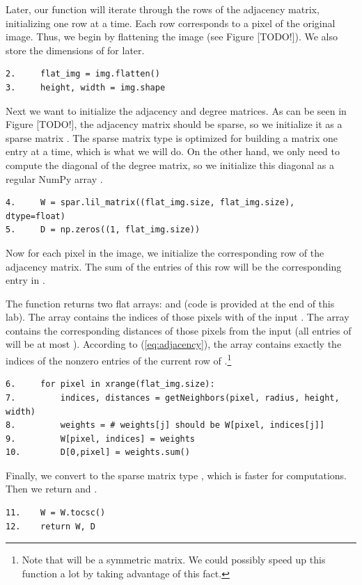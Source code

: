 Later, our function will iterate through the rows of the adjacency matrix, initializing one row at a time. Each row corresponds to a pixel of the original image. Thus, we begin by flattening the image (see Figure [TODO!]). We also store the dimensions of  for later.
\begin{lstlisting}
2.     flat_img = img.flatten()
3.     height, width = img.shape
\end{lstlisting}

Next we want to initialize the adjacency and degree matrices. As can be seen in Figure [TODO!], the adjacency matrix should be sparse, so we initialize it as a sparse matrix . The sparse matrix type  is optimized for building a matrix one entry at a time, which is what we will do. On the other hand, we only need to compute the diagonal of the degree matrix, so we initialize this diagonal as a regular NumPy array .
\begin{lstlisting}
4.     W = spar.lil_matrix((flat_img.size, flat_img.size), dtype=float)
5.     D = np.zeros((1, flat_img.size))
\end{lstlisting}

Now for each pixel in the image, we initialize the corresponding row of the adjacency matrix. 
The sum of the entries of this row will be the corresponding entry in . 

The function  returns two flat arrays:  and  (code is provided at the end of this lab). The array  contains the indices of those pixels with  of the input . The array  contains the corresponding distances of those pixels from the input  (all entries of  will be at most ). According to (\ref{eq:adjacency}), the array  contains exactly the indices of the nonzero entries of the current row of .\footnote{Note that  will be a symmetric matrix. We could possibly speed up this function a lot by taking advantage of this fact.}

\begin{lstlisting}
6.     for pixel in xrange(flat_img.size):
7.         indices, distances = getNeighbors(pixel, radius, height, width)
8.         weights = # weights[j] should be W[pixel, indices[j]]
9.         W[pixel, indices] = weights
10.        D[0,pixel] = weights.sum()
\end{lstlisting}

Finally, we convert  to the sparse matrix type , which is faster for computations. Then we return  and . 
\begin{lstlisting}
11.    W = W.tocsc()
12.    return W, D
\end{lstlisting}



